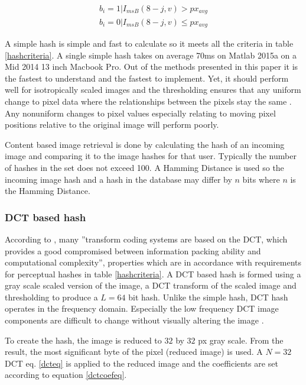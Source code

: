 \documentclass[english,12pt,a4paper,pdftex,elec,utf8, table]{aaltothesis}
\begin{document}
\begin{equation} \label{simplehasheqmirror}
  \begin{split}
  b_{i} = 1 | I_{msB}(8-j,v) > px_{avg}\\
  b_{i} = 0 | I_{msB}(8-j,v) \leq px_{avg}
  \end{split}
\end{equation}

A simple hash is simple and fast to calculate so it meets all the criteria in table \ref{hashcriteria}. A single simple hash takes on average 70ms on Matlab 2015a on a Mid 2014 13 inch Macbook Pro. Out of the methods presented in this paper it is the fastest to understand and the fastest to implement. Yet, it should perform well for isotropically scaled images and the thresholding ensures that any uniform change to pixel data where the relationships between the pixels stay the same \cite{Zauner2010}. Any nonuniform changes to pixel values especially relating to moving pixel positions relative to the original image will perform poorly.

Content based image retrieval is done by calculating the hash of an incoming image and comparing it to the image hashes for that user. Typically the number of hashes in the set does not exceed 100. A Hamming Distance is used so the incoming image hash and a hash in the database may differ by $n$ bits where $n$ is the Hamming Distance.

\subsubsection{DCT based hash}
According to \cite{Gonzalez2002}, many ''transform coding systems are based on the DCT, which provides a good compromised between information packing ability and computational complexity'', properties which are in accordance with requirements for perceptual hashes in table \ref{hashcriteria}. A DCT based hash is formed using a gray scale scaled version of the image, a DCT transform of the scaled image and thresholding to produce a $L=64$ bit hash. Unlike the simple hash, DCT hash operates in the frequency domain. Especially the low frequency DCT image components are difficult to change without visually altering the image \cite{Fridrich1999}.

To create the hash, the image is reduced to $32$ by $32$ px gray scale. From the result, the most significant byte of the pixel (reduced image) is used. A $N =32$ DCT eq. \ref{dcteq} is applied to the reduced image and the coefficients are set according to equation \ref{dctcoefeq}.
\end{document}
